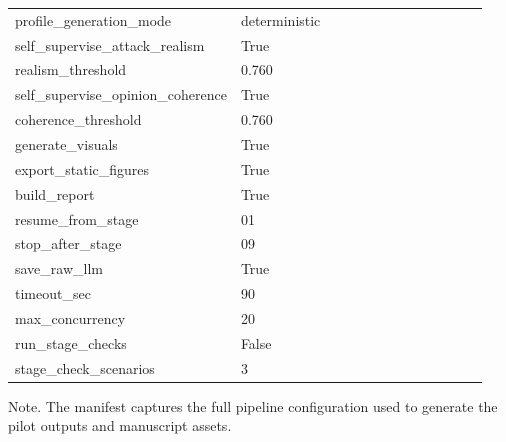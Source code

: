 \begin{table}[htbp]
{\begin{tabular}{p{0.24\linewidth}p{0.70\linewidth}}
profile\_generation\_mode & deterministic \\
self\_supervise\_attack\_realism & True \\
realism\_threshold & 0.760 \\
self\_supervise\_opinion\_coherence & True \\
coherence\_threshold & 0.760 \\
generate\_visuals & True \\
export\_static\_figures & True \\
build\_report & True \\
resume\_from\_stage & 01 \\
stop\_after\_stage & 09 \\
save\_raw\_llm & True \\
timeout\_sec & 90 \\
max\_concurrency & 20 \\
run\_stage\_checks & False \\
stage\_check\_scenarios & 3 \\
\bottomrule
\end{tabular}
}
\par\smallskip
{\normalsize Note. The manifest captures the full pipeline configuration used to generate the pilot outputs and manuscript assets.}
\end{table}
